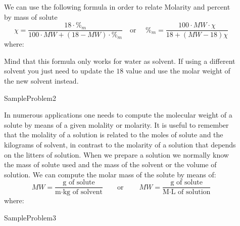 \documentclass[main.tex]{subfiles}
\newcommand\chapterlabel{Ch-solutions}\setcounter{figurenewcounter}{0}\setcounter{tablenewcounter}{0}\setcounter{formulanewcounter}{0}
\begin{document}
\begin{description}
\item[] 
We can use the following formula in order to relate Molarity and percent by mass of solute
\begin{equation}
\boxed{ \chi=\frac{18\cdot  \%_{m}  }{100\cdot MW + (18-MW)\cdot \%_{m} }}
\quad  \text{or }\quad 
\boxed{ \%_{m}=\frac{ 100\cdot MW\cdot \chi  }{ 18+(MW-18)\chi }}
\label{\chapterlabel:equation9}
\end{equation}
where:
Mind that this formula only works for water as solvent. If using a different solvent you just need to update the $18$ value and use the molar weight of the new solvent instead.



{SampleProblem2}






 


\item[] 
In numerous applications one needs to compute the molecular weight of a solute by means of a given molality or molarity. It is useful to remember that the molality of a solution is related to the moles of solute and the kilograms of solvent, in contrast to the molarity of a solution that depends on the litters of solution. When we prepare a solution we normally know the mass of solute used and the mass of the solvent or the volume of solution. We can compute the molar mass of the solute by means of:
\begin{equation}
\boxed{ MW=\frac{ \text{g of solute}   }{\text{m}\cdot \text{kg of solvent}   	}}
\quad\quad\text{or} \quad\quad\
\boxed{ MW=\frac{ \text{g of solute}   }{\text{M}\cdot \text{L of solution}}}
\label{\chapterlabel:equation17}
\end{equation}
where:
{SampleProblem3}






\end{description}
\end{document}
